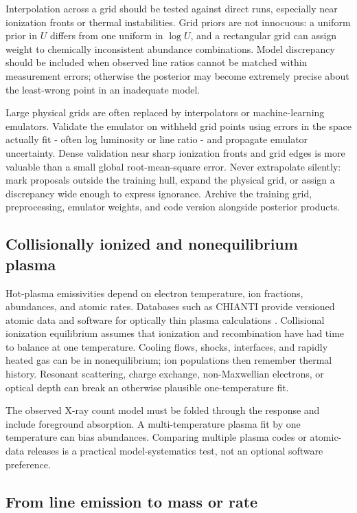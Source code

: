 Interpolation across a grid should be tested against direct runs, especially
near ionization fronts or thermal instabilities.  Grid priors are not innocuous:
a uniform prior in $U$ differs from one uniform in $\log U$, and a rectangular
grid can assign weight to chemically inconsistent abundance combinations.
Model discrepancy should be included when observed line ratios cannot be matched
within measurement errors; otherwise the posterior may become extremely precise
about the least-wrong point in an inadequate model.

Large physical grids are often replaced by interpolators or machine-learning
emulators.  Validate the emulator on withheld grid points using errors in the
space actually fit - often log luminosity or line ratio - and propagate emulator
uncertainty.  Dense validation near sharp ionization fronts and grid edges is
more valuable than a small global root-mean-square error.  Never extrapolate
silently: mark proposals outside the training hull, expand the physical grid,
or assign a discrepancy wide enough to express ignorance.  Archive the training
grid, preprocessing, emulator weights, and code version alongside posterior
products.

\subsection{Collisionally ionized and nonequilibrium plasma}

Hot-plasma emissivities depend on electron temperature, ion fractions,
abundances, and atomic rates.  Databases such as CHIANTI provide versioned
atomic data and software for optically thin plasma calculations
\citep{Dere1997,DelZanna2021}.  Collisional ionization equilibrium assumes that
ionization and recombination have had time to balance at one temperature.
Cooling flows, shocks, interfaces, and rapidly heated gas can be in
nonequilibrium; ion populations then remember thermal history.  Resonant
scattering, charge exchange, non-Maxwellian electrons, or optical depth can
break an otherwise plausible one-temperature fit.

The observed X-ray count model must be folded through the response and include
foreground absorption.  A multi-temperature plasma fit by one temperature can
bias abundances.  Comparing multiple plasma codes or atomic-data releases is a
practical model-systematics test, not an optional software preference.

\subsection{From line emission to mass or rate}

